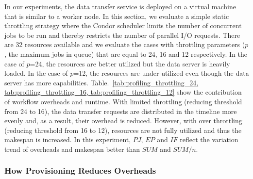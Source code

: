 In our experiments, the data transfer service is deployed on a virtual machine that is similar to a worker node.  In this section, we evaluate a simple static throttling strategy where the Condor scheduler limits the number of concurrent jobs to be run and thereby restricts the number of parallel I/O requests. There are 32 resources available and we evaluate the cases with throttling parameters ($p$, the maximum jobs in queue) that are equal to 24, 16 and 12 respectively. In the case of $p$=24, the resources are better utilized but the data server is heavily loaded. In the case of $p$=12, the resources are under-utilized even though the data server has more capabilities. Table.~\ref{tab:profiling_throttling_24, tab:profiling_throttling_16, tab:profiling_throttling_12} show the contribution of workflow overheads and runtime. With limited throttling (reducing threshold from 24 to 16), the data transfer requests are distributed in the timeline more evenly and, as a result, their overhead is reduced. However, with over throttling (reducing threshold from 16 to 12), resources are not fully utilized and thus the makespan is increased. In this experiment, $PJ$, $EP$ and $IF$ reflect the variation trend of overheads and makespan better than $SUM$ and $SUM/n$. 



\subsubsection{How Provisioning Reduces Overheads}

